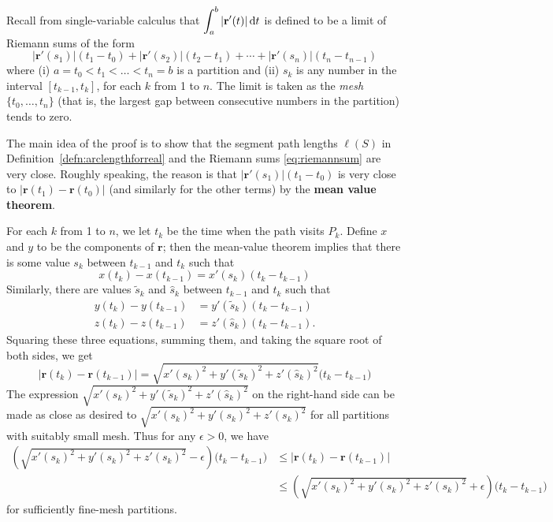 \documentclass{watsonbook}
\begin{document}
  \begin{pf}[title=Proof (idea)]
    Recall from single-variable calculus that
    $\displaystyle{\int_a^b |\mathbf{r}'(t)| \, \mathrm{d}t}$ is defined to be a limit of
    Riemann sums of the form
    \begin{equation} \label{eq:riemannsum}
      |\mathbf{r}'(s_1)|(t_1-t_0) + |\mathbf{r}'(s_2)|(t_2-t_1) + \cdots + |\mathbf{r}'(s_n)|(t_n-t_{n-1})
    \end{equation}
    where (i) $a = t_0 < t_1 < \ldots < t_n = b$ is a partition and
    (ii) $s_k$ is any number in the interval $[t_{k-1},t_k]$, for each
    $k$ from 1 to $n$. The limit is taken as the \textit{mesh}
    $\{t_0, \ldots, t_n\}$ (that is, the largest gap between
    consecutive numbers in the partition) tends to zero. 

    The main idea of the proof is to show that the segment path
    lengths $\ell(S)$ in Definition~\ref{defn:arclengthforreal} and
    the Riemann sums \eqref{eq:riemannsum} are very close. Roughly
    speaking, the reason is that $|\mathbf{r}'(s_1)|(t_1-t_0)$ is very
    close to $|\mathbf{r}(t_1) - \mathbf{r}(t_0)|$ (and similarly for
    the other terms) by the \textbf{mean value theorem}.

    For each $k$ from 1 to $n$, we let $t_k$ be the time when the path
    visits $P_k$. Define $x$ and $y$ to be the components of
    $\mathbf{r}$; then the mean-value theorem implies that there is
    some value $s_k$ between $t_{k-1}$ and $t_k$ such that 
    \[
      x(t_k) - x(t_{k-1}) = x'(s_k)(t_{k}-t_{k-1})
    \]
    Similarly, there are values $\tilde{s}_k$ and $\hat{s}_k$ between
    $t_{k-1}$ and $t_k$ such that
    \begin{align*}
      y(t_k) - y(t_{k-1}) &= y'(\tilde{s}_k)(t_{k}-t_{k-1})\\
      z(t_k) - z(t_{k-1}) &= z'(\hat{s}_k)(t_{k}-t_{k-1}). 
    \end{align*}
    Squaring these three equations, summing them, and taking the
    square root of both sides, we get
    \[
      |\mathbf{r}(t_k) - \mathbf{r}(t_{k-1})| = \sqrt{x'(s_k)^2 +
        y'(\tilde{s}_k)^2 + z'(\hat{s}_k)^2}\bigg(t_k-t_{k-1}\bigg)
    \]
    The expression
    $\sqrt{x'(s_k)^2 + y'(\tilde{s}_k)^2 + z'(\hat{s}_k)^2}$ on the
    right-hand side can be made as close as desired to
    $\sqrt{x'(s_k)^2 + y'({s}_k)^2 + z'({s}_k)^2}$ for all partitions
    with suitably small mesh. Thus for any $\epsilon > 0$, we have
    \begin{align} \label{eq:ineq}
       \left(\sqrt{x'(s_k)^2 +
         y'({s}_k)^2 + z'({s}_k)^2} - \epsilon\right)
      \bigg(t_k-t_{k-1}\bigg)  
      &\leq
        |\mathbf{r}(t_k) - \mathbf{r}(t_{k-1})| \\ \nonumber
      &\leq \left(\sqrt{x'(s_k)^2 +
         y'({s}_k)^2 + z'({s}_k)^2} + \epsilon\right) \bigg(t_k-t_{k-1}\bigg)
    \end{align}
    for sufficiently fine-mesh partitions. 
    

\end{pf}
\end{document}
